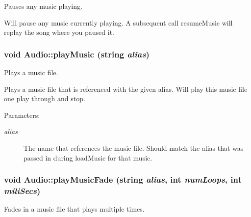 Pauses any music playing. 

Will pause any music currently playing. A subsequent call resumeMusic will replay the song where you paused it. \hypertarget{class_audio_bd144ca5357828282ba0a6b328d770b7}{
\subsubsection[{playMusic}]{\setlength{\rightskip}{0pt plus 5cm}void Audio::playMusic (string {\em alias})}}
\label{class_audio_bd144ca5357828282ba0a6b328d770b7}


Plays a music file. 

Plays a music file that is referenced with the given alias. Will play this music file one play through and stop. \begin{Desc}
\item[Parameters:]
\begin{description}
\item[{\em alias}]The name that references the music file. Should match the alias that was passed in during loadMusic for that music. \end{description}
\end{Desc}
\hypertarget{class_audio_10bf7c77227aba561ddb6e5870cc092d}{
\subsubsection[{playMusicFade}]{\setlength{\rightskip}{0pt plus 5cm}void Audio::playMusicFade (string {\em alias}, \/  int {\em numLoops}, \/  int {\em miliSecs})}}
\label{class_audio_10bf7c77227aba561ddb6e5870cc092d}


Fades in a music file that plays multiple times. 

